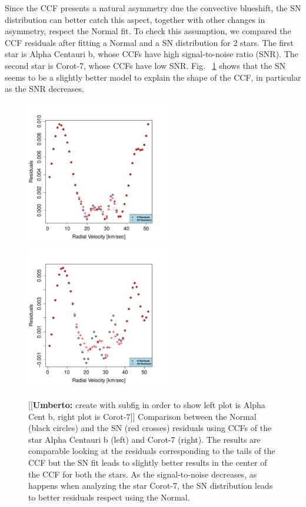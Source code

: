 \documentclass[11pt, oneside]{article}
\newcommand{\umberto}[1]{{\color{green}[[\textbf{Umberto: }#1]]}}
\begin{document}
Since the CCF presents a natural asymmetry due the convective blueshift, the SN distribution can better catch this aspect, together with other changes in asymmetry, respect the Normal fit. To check this assumption, we compared the CCF residuals after fitting a Normal and a SN distribution for 2 stars. The first star is Alpha Centauri b, whose CCFs have high signal-to-noise ratio (SNR). The second star is Corot-7, whose CCFs have low SNR. Fig.~ \ref{fig:Residual.comparison} shows that the SN seems to be a slightly better model to explain the shape of the CCF, in particular as the SNR decreases.
%
\begin{figure}[htbp]
   \centering
\includegraphics[height = 2.5in]{[1]HD128621Residuals.pdf} 
\includegraphics[height = 2.5in]{[1]LRa01_E2Residuals.pdf} 
   \caption{\umberto{create with subfig in order to show left plot is Alpha Cent b, right plot is Corot-7} Comparison between the Normal (black circles) and the SN (red crosses) residuals using CCFs of the star Alpha Centauri b (left) and Corot-7 (right). The results are comparable looking at the residuals corresponding to the tails of the CCF but the SN fit leads to slightly better results in the center of the CCF for both the stars. As the signal-to-noise decreases, as happens when analyzing the star Corot-7, the SN distribution leads to better residuals respect using the Normal.}
    \label{fig:Residual.comparison}
\end{figure}
%
\end{document}
